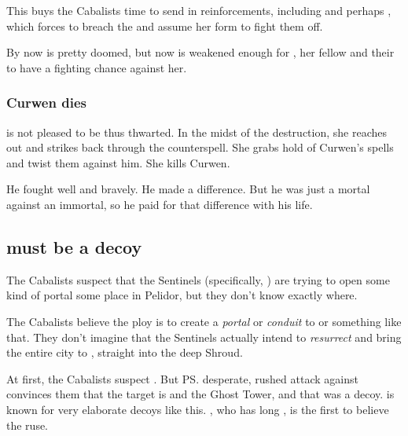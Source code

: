 This buys the Cabalists time to send in reinforcements, including \banes{} and perhaps \resphain, which forces \Nzessuacrith{} to breach the \charade{} and assume her \draconic{} form to fight them off. 

By now \Forclin{} is pretty doomed, but now \Nzessuacrith{} is weakened enough for \Achsah{}, her fellow \resphain{} and their  to have a fighting chance against her. 





\subsubsection{Curwen dies}
\Takestsha is not pleased to be thus thwarted. 
In the midst of the destruction, she reaches out and strikes back through the counterspell.
She grabs hold of Curwen's spells and twist them against him.
She kills Curwen.

He fought well and bravely.
He made a difference.
But he was just a mortal against an immortal, so he paid for that difference with his life. 









\subsection[Malcur must be a decoy]{\Malcur must be a decoy}
The Cabalists suspect that the Sentinels (specifically, \Secherdamon) are trying to open some kind of portal some place in Pelidor, but they don't know exactly where. 

The Cabalists believe the ploy is to create a \emph{portal} or \emph{conduit} to \Nithdornazsh{} or something like that. 
They don't imagine that the Sentinels actually intend to \emph{resurrect} \Nithdornazsh{} and bring the entire city to \Azmith, straight into the deep Shroud. 

At first, the Cabalists suspect \Malcur. 
But \ps{\Takestsha} desperate, rushed attack against \Forclin{} convinces them that the target is \Forclin{} and the Ghost Tower, and that \Malcur was a decoy. 
\Secherdamon{} is known for very elaborate decoys like this. 
\Achsah, who has long , is the first to believe the \Forclin{} ruse. 





